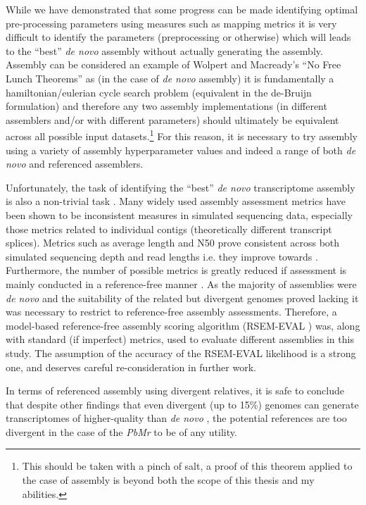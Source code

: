 While we have demonstrated that some progress can be made 
identifying optimal pre-processing parameters using measures such as mapping metrics 
it is very difficult to identify the parameters (preprocessing or otherwise) which will leads to the ``best'' 
\textit{de novo} assembly without actually generating the assembly.
  Assembly can be considered an example of Wolpert and Macready's ``No Free Lunch Theorems'' \citep{Wolpert1995,Wolpert1997} 
  as (in the case of \textit{de novo} assembly) it is fundamentally a hamiltonian/eulerian cycle search problem (equivalent
    in the de-Bruijn formulation) and therefore any two assembly implementations (in different assemblers and/or
    with different parameters) should ultimately be equivalent across all possible input datasets.\footnote{
    This should be taken with a pinch of salt, a proof of this theorem applied to the case of assembly is beyond
both the scope of this thesis and my abilities.} For this reason, it is necessary to try
assembly using a variety of assembly hyperparameter values and indeed a range of both \textit{de novo} and referenced assemblers. 

Unfortunately, the task of identifying the ``best'' \textit{de novo} transcriptome assembly is also a non-trivial 
task \citep{Neil2013c}.  Many widely used assembly assessment metrics have been shown to be
inconsistent measures in simulated sequencing data, especially those metrics related to individual
contigs (theoretically different transcript splices).  Metrics such as average length and N50
prove consistent across both simulated sequencing depth and read lengths i.e. they improve 
towards \citep{Neil2013c}.  Furthermore, the number of possible metrics is greatly reduced
if assessment is mainly conducted in a reference-free manner \citep{Li2014}.  As the majority of
assemblies were \textit{de novo} and the suitability of the related but divergent genomes
proved lacking it was necessary to restrict to reference-free assembly assessments.  
Therefore, a model-based reference-free assembly scoring algorithm (RSEM-EVAL \citep{Li2014}) was,
 along with standard (if imperfect) metrics, used to evaluate different assemblies in this study.
 The assumption of the accuracy of the RSEM-EVAL likelihood is a strong one, and deserves careful re-consideration
 in further work.

In terms of referenced assembly using divergent relatives, 
it is safe to conclude that despite other findings that even divergent 
(up to 15\%) genomes can generate transcriptomes of higher-quality
than \textit{de novo} \citep{Vijay2013}, the potential references
are too divergent in the case of the \textit{PbMr} to be of any utility.
    
